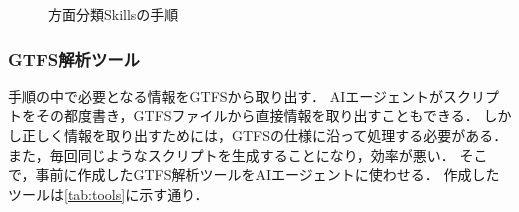 \begin{figure}[t]
{\begin{minipage}{\dimexpr\columnwidth-2\fboxsep-2\fboxrule\relax}
        \end{minipage}%
    }
    \caption{方面分類Skillsの手順}
    \label{fig:skills}
\end{figure}

\subsubsection{GTFS解析ツール}

手順の中で必要となる情報をGTFSから取り出す．
AIエージェントがスクリプトをその都度書き，GTFSファイルから直接情報を取り出すこともできる．
しかし正しく情報を取り出すためには，GTFSの仕様に沿って処理する必要がある．
また，毎回同じようなスクリプトを生成することになり，効率が悪い．
そこで，事前に作成したGTFS解析ツールをAIエージェントに使わせる．
作成したツールは\cref{tab:tools}に示す通り．

